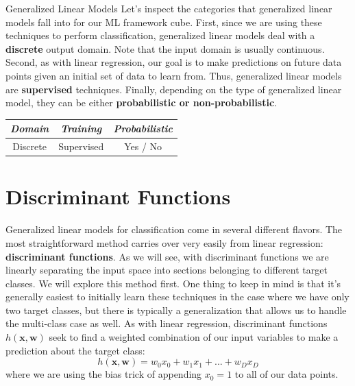 \begin{mlcube}{Generalized Linear Models}
Let's inspect the categories that generalized linear models fall into for our ML framework cube. First, since we are using these techniques to perform classification, generalized linear models deal with a \textbf{discrete} output domain. Note that the input domain is usually continuous. Second, as with linear regression, our goal is to make predictions on future data points given an initial set of data to learn from. Thus, generalized linear models are \textbf{supervised} techniques. Finally, depending on the type of generalized linear model, they can be either \textbf{probabilistic or non-probabilistic}.
\begin{center}
    \begin{tabular}{c|c|c}
    \textit{\textbf{Domain}} & \textit{\textbf{Training}} & \textit{\textbf{Probabilistic}} \\
    \hline
    Discrete & Supervised & Yes / No \\
    \end{tabular}
\end{center}
\end{mlcube}

\section{Discriminant Functions}
Generalized linear models for classification come in several different flavors. The most straightforward method carries over very easily from linear regression: \textbf{discriminant functions}. As we will see, with discriminant functions we are linearly separating the input space into sections belonging to different target classes. We will explore this method first. One thing to keep in mind is that it's generally easiest to initially learn these techniques in the case where we have only two target classes, but there is typically a generalization that allows us to handle the multi-class case as well. \newline \newline
As with linear regression, discriminant functions $h(\textbf{x}, \textbf{w})$ seek to find a weighted combination of our input variables to make a prediction about the target class:
\begin{equation} \label{basic-discriminant-fn}
	h(\textbf{x}, \textbf{w}) = w_{0}x_{0} + w_{1}x_{1} + ... + w_{D}x_{D}
\end{equation}
where we are using the bias trick of appending $x_{0} = 1$ to all of our data points.


